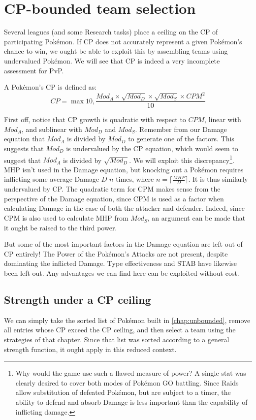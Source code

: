\chapter{CP-bounded team selection}

Several leagues (and some Research tasks) place a ceiling on the CP of
 participating Pokémon.
If CP does not accurately represent a given Pokémon's chance to win, we ought
 be able to exploit this by assembling teams using undervalued Pokémon.
We will see that CP is indeed a very incomplete assessment for PvP.

A Pokémon's CP is defined as:
\[ CP = \max{10, \frac{Mod_A \times \sqrt{Mod_D} \times \sqrt{Mod_S} \times CPM^2}{10}} \]

First off, notice that CP growth is quadratic with respect to $CPM$,
 linear with $Mod_A$, and sublinear with $Mod_D$ and $Mod_S$.
Remember from our Damage equation that $Mod_A$ is divided by $Mod_D$
 to generate one of the factors.
This suggests that $Mod_D$ is undervalued by the CP equation, which
 would seem to suggest that $Mod_A$ is divided by $\sqrt{Mod_D}$.
We will exploit this discrepancy\footnote{Why would the game use such
 a flawed measure of power? A single stat was clearly desired to cover both
 modes of Pokémon GO battling. Since Raids allow substitution of defeated
 Pokémon, but are subject to a timer, the ability to defend and absorb
 Damage is less important than the capability of inflicting damage.}.
MHP isn't used in the Damage equation, but knocking out a Pokémon
 requires inflicting some average Damage $D$ $n$ times,
 where $n = \lceil\frac{MHP}{D}\rceil$.
It is thus similarly undervalued by CP\@.
The quadratic term for CPM makes sense from the perspective of the Damage
 equation, since CPM is used as a factor when calculating Damage in the
 case of both the attacker and defender.
Indeed, since CPM is also used to calculate MHP from $Mod_S$, an argument
 can be made that it ought be raised to the third power.

But some of the most important factors in the Damage equation are left
out of CP entirely! The Power of the Pokémon's Attacks are not present,
despite dominating the inflicted Damage. Type effectiveness and STAB
have likewise been left out. Any advantages we can find here can be
exploited without cost.

\section{Strength under a CP ceiling}
We can simply take the sorted list of Pokémon built in
\autoref{chap:unbounded}, remove all entries whose CP exceed the CP ceiling,
and then select a team using the strategies of that chapter. Since
that list was sorted according to a general strength function, it
ought apply in this reduced context.
